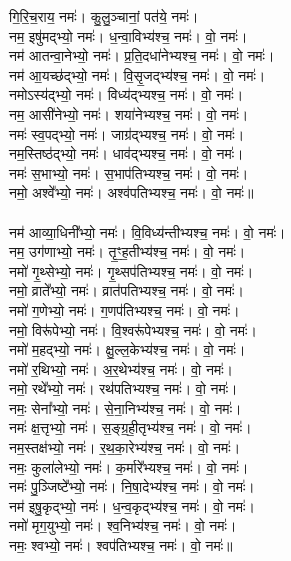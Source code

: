 गि॒रि॒च॒राय॒ नमः॑। कु॒लु॒ञ्चानां॒ पत॑ये॒ नमः॑।\\
नम॒ इषु॑मद्भ्यो॒ नमः॑। ध॒न्वा॒विभ्य॑श्च॒ नमः॑। वो॒ नमः॑।\\
नम॑ आतन्वा॒नेभ्यो॒ नमः॑। प्र॒ति॒दधा॑नेभ्यश्च॒ नमः॑। वो॒ नमः॑।\\
नम॑ आ॒यच्छ॑द्भ्यो॒ नमः॑। वि॒सृ॒जद्भ्य॑श्च॒ नमः॑। वो॒ नमः॑।\\
नमोऽस्य॑द्भ्यो॒ नमः॑। विध्य॑द्भ्यश्च॒ नमः॑। वो॒ नमः॑।\\
नम॒ आसी॑नेभ्यो॒ नमः॑। शया॑नेभ्यश्च॒ नमः॑। वो॒ नमः॑।\\
नमः॑ स्व॒पद्भ्यो॒ नमः॑। जाग्र॑द्भ्यश्च॒ नमः॑। वो॒ नमः॑।\\
नम॒स्तिष्ठ॑द्भ्यो॒ नमः॑। धाव॑द्भ्यश्च॒ नमः॑। वो॒ नमः॑।\\
नमः॑ स॒भाभ्यो॒ नमः॑। स॒भाप॑तिभ्यश्च॒ नमः॑। वो॒ नमः॑।\\
नमो॒ अश्वे᳚भ्यो॒ नमः॑। अश्व॑पतिभ्यश्च॒ नमः॑। वो॒ नमः॑॥\\
\\
नम॑ आव्या॒धिनी᳚भ्यो॒ नमः॑। वि॒विध्य॑न्तीभ्यश्च॒ नमः॑। वो॒ नमः॑।\\
नम॒ उग॑णाभ्यो॒ नमः॑। तृ॒ꣳ॒ह॒तीभ्य॑श्च॒ नमः॑। वो॒ नमः॑।\\
नमो॑ गृ॒थ्सेभ्यो॒ नमः॑। गृ॒थ्सप॑तिभ्यश्च॒ नमः॑। वो॒ नमः॑।\\
नमो॒ व्राते᳚भ्यो॒ नमः॑। व्रात॑पतिभ्यश्च॒ नमः॑। वो॒ नमः॑।\\
नमो॑ ग॒णेभ्यो॒ नमः॑। ग॒णप॑तिभ्यश्च॒ नमः॑। वो॒ नमः॑।\\
नमो॒ विरू॑पेभ्यो॒ नमः॑। वि॒श्वरू॑पेभ्यश्च॒ नमः॑। वो॒ नमः॑।\\
नमो॑ म॒हद्भ्यो॒ नमः॑। क्षु॒ल्ल॒केभ्य॑श्च॒ नमः॑। वो॒ नमः॑।\\
नमो॑ र॒थिभ्यो॒ नमः॑। अ॒र॒थेभ्य॑श्च॒ नमः॑। वो॒ नमः॑।\\
नमो॒ रथे᳚भ्यो॒ नमः॑। रथ॑पतिभ्यश्च॒ नमः॑। वो॒ नमः॑।\\
नमः॒ सेना᳚भ्यो॒ नमः॑। से॒ना॒निभ्य॑श्च॒ नमः॑। वो॒ नमः॑।\\
नमः॑ क्ष॒त्तृभ्यो॒ नमः॑। स॒ङ्ग्र॒ही॒तृभ्य॑श्च॒ नमः॑। वो॒ नमः॑।\\
नम॒स्तक्ष॑भ्यो॒ नमः॑। र॒थ॒का॒रेभ्य॑श्च॒ नमः॑। वो॒ नमः॑।\\
नमः॒ कुला॑लेभ्यो॒ नमः॑। क॒र्मारे᳚भ्यश्च॒ नमः॑। वो॒ नमः॑।\\
नमः॑ पु॒ञ्जिष्टे᳚भ्यो॒ नमः॑। नि॒षा॒देभ्य॑श्च॒ नमः॑। वो॒ नमः॑।\\
नम॑ इषु॒कृद्भ्यो॒ नमः॑। ध॒न्व॒कृद्भ्य॑श्च॒ नमः॑। वो॒ नमः॑।\\
नमो॑ मृग॒युभ्यो॒ नमः॑। श्व॒निभ्य॑श्च॒ नमः॑। वो॒ नमः॑।\\
नमः॒ श्वभ्यो॒ नमः॑। श्वप॑तिभ्यश्च॒ नमः॑। वो॒ नमः॑॥\\
